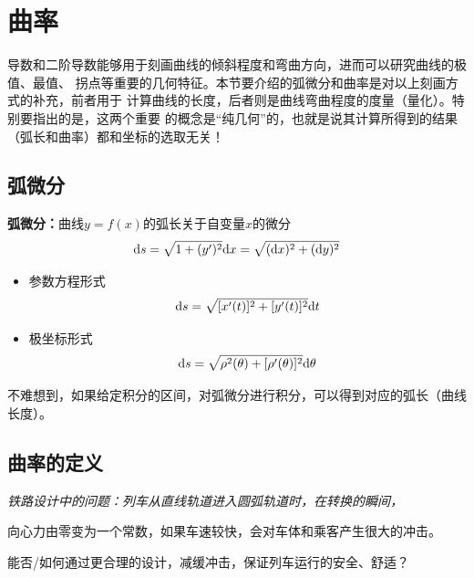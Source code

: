 \section{曲率}

导数和二阶导数能够用于刻画曲线的倾斜程度和弯曲方向，进而可以研究曲线的极值、最值、
拐点等重要的几何特征。本节要介绍的弧微分和曲率是对以上刻画方式的补充，前者用于
计算曲线的长度，后者则是曲线弯曲程度的度量（量化）。特别要指出的是，这两个重要
的概念是“纯几何”的，也就是说其计算所得到的结果（弧长和曲率）都和坐标的选取无关！

\subsection{弧微分}

\begin{thx}
	{\bf 弧微分：}曲线$y=f(x)$的弧长关于自变量$x$的微分
	$$\mathrm{d} s=\sqrt{1+(y')^2}\mathrm{d} x =\sqrt{(\mathrm{d} x)^2+(\mathrm{d} y)^2}$$
	\begin{itemize}
	  \item 参数方程形式 
	  $$\mathrm{d} s=\sqrt{[x'(t)]^2+[y'(t)]^2}\mathrm{d} t$$ 
	  \vspace{-3ex}
	  \item 极坐标形式 
	  $$\mathrm{d} s=\sqrt{\rho^2(\theta)+[\rho'(\theta)]^2}\mathrm{d}\theta$$
	\end{itemize}
\end{thx}
不难想到，如果给定积分的区间，对弧微分进行积分，可以得到对应的弧长（曲线长度）。

\subsection{曲率的定义}

\begin{center}
	
	{\it 铁路设计中的问题：列车从直线轨道进入圆弧轨道时，在转换的瞬间，
	
	向心力由零变为一个常数，如果车速较快，会对车体和乘客产生很大的冲击。
	
	能否/如何通过更合理的设计，减缓冲击，保证列车运行的安全、舒适？}
\end{center}

